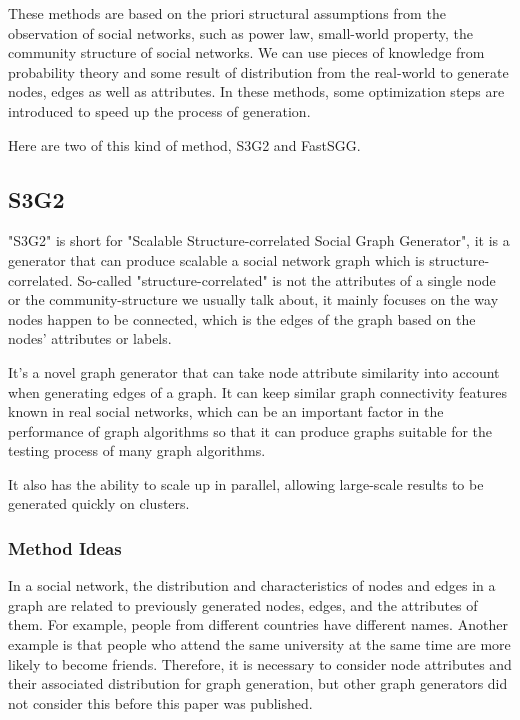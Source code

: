 \begin{survey}
These methods are based on the priori structural assumptions from the
observation of social networks, such as power law, small-world property,
the community structure of social networks. We can use pieces of
knowledge from probability theory and some result of distribution from
the real-world to generate nodes, edges as well as attributes. In these
methods, some optimization steps are introduced to speed up the process
of generation.

Here are two of this kind of method, S3G2 and FastSGG.

\subsection{S3G2\cite{Minh2012S3G2}}

"S3G2" is short for "Scalable Structure-correlated Social Graph
Generator", it is a generator that can produce scalable a social network
graph which is structure-correlated. So-called "structure-correlated" is
not the attributes of a single node or the community-structure we
usually talk about, it mainly focuses on the way nodes happen to be
connected, which is the edges of the graph based on the nodes'
attributes or labels.

It's a novel graph generator that can take node attribute similarity
into account when generating edges of a graph. It can keep similar graph
connectivity features known in real social networks, which can be an
important factor in the performance of graph algorithms so that it can
produce graphs suitable for the testing process of many graph
algorithms.

It also has the ability to scale up in parallel, allowing large-scale
results to be generated quickly on clusters.

\subsubsection{Method Ideas}

In a social network, the distribution and characteristics of nodes and
edges in a graph are related to previously generated nodes, edges, and
the attributes of them. For example, people from different countries
have different names. Another example is that people who attend the same
university at the same time are more likely to become friends.
Therefore, it is necessary to consider node attributes and their
associated distribution for graph generation, but other graph generators
did not consider this before this paper was published.


\end{survey}
